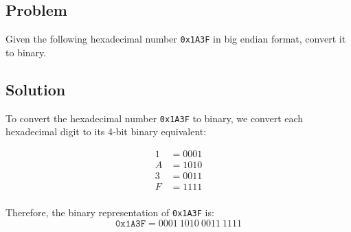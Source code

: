 \subsection*{Problem}
Given the following hexadecimal number \texttt{0x1A3F} in big endian format, convert it to binary.

\subsection*{Solution}
To convert the hexadecimal number \texttt{0x1A3F} to binary, we convert each hexadecimal digit to its 4-bit binary equivalent:

\begin{align*}
1 & = 0001 \\
A & = 1010 \\
3 & = 0011 \\
F & = 1111 \\
\end{align*}

Therefore, the binary representation of \texttt{0x1A3F} is:
\[
\texttt{0x1A3F} = 0001\ 1010\ 0011\ 1111
\]